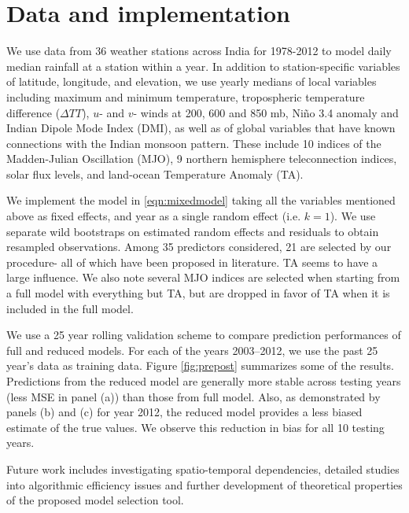 \documentclass[11pt,twocolumn,twoside]{IEEEtran}
\begin{document}
\section{Data and implementation}

We use data from 36 weather stations across India for 1978-2012 to model daily median rainfall at a station within a year. In addition to station-specific variables of latitude, longitude, and elevation, we use yearly medians of local variables including maximum and minimum temperature, tropospheric temperature difference ($\Delta TT$), $u$- and $v$- winds at 200, 600 and 850 mb, Ni\~{n}o 3.4 anomaly and Indian Dipole Mode Index (DMI), as well as of global variables that have known connections with the Indian monsoon pattern.  These include 10 indices of the Madden-Julian Oscillation (MJO), 9 northern hemisphere teleconnection indices, solar flux levels, and land-ocean Temperature Anomaly (TA).

We implement the model in \ref{eqn:mixedmodel} taking all the variables mentioned above as fixed effects, and year as a single random effect (i.e. $k=1$). We use separate wild bootstraps on estimated random effects and residuals to obtain resampled observations. Among 35 predictors considered, 21 are selected by our procedure- all of which have been proposed in literature. TA seems to have a large influence.  We also note several MJO indices are selected when starting from a full model with everything but TA, but are dropped in favor of TA when it is included in the full model.

We use a 25 year rolling validation scheme to compare prediction performances of full and reduced models. For each of the years 2003--2012, we use the past 25 year's data as training data. Figure \ref{fig:prepost} summarizes some of the results. Predictions from the reduced model are generally more stable across testing years (less MSE in panel (a)) than those from full model. Also, as demonstrated by panels (b) and (c) for year 2012, the reduced model provides a less biased estimate of the true values.  We observe this reduction in bias for all 10 testing years.

Future work includes investigating spatio-temporal dependencies, detailed studies into algorithmic efficiency issues and further development of theoretical properties of the proposed model selection tool.




\end{document}
